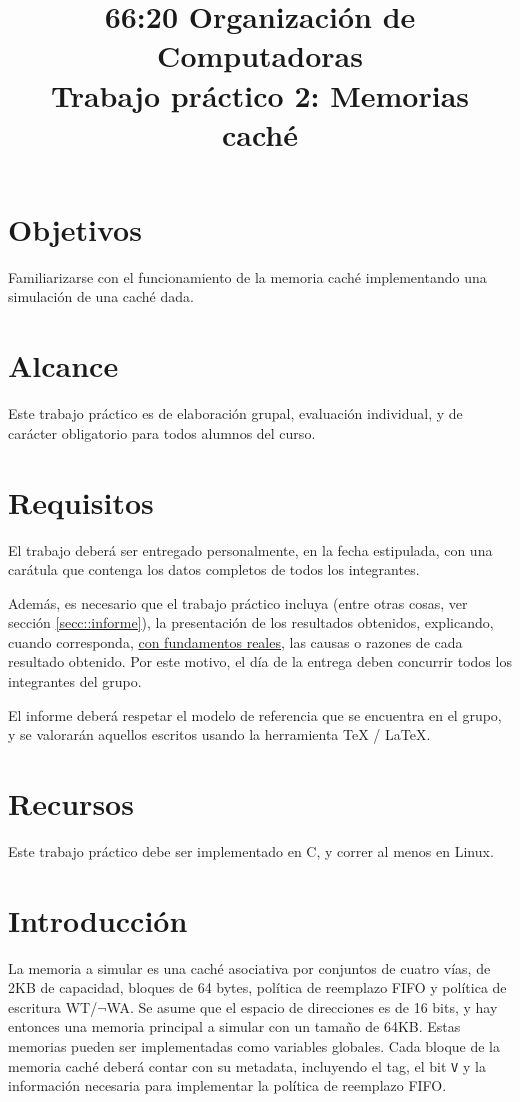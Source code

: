\documentclass[a4paper,11pt]{article}
\title{66:20 Organización de Computadoras\\
       Trabajo práctico 2: Memorias caché}
\author{}
\date{}
\begin{document}
\maketitle
\thispagestyle{empty}   %

\section{Objetivos}
Familiarizarse con el funcionamiento de la memoria caché implementando una simulación de una caché dada.
\section{Alcance}

Este trabajo práctico es de elaboración grupal, evaluación individual, y de
carácter obligatorio para todos alumnos del curso.

\section{Requisitos}
El trabajo deberá ser entregado personalmente, en la fecha estipulada, con una
carátula que contenga los datos completos de todos los integrantes. 

Además, es necesario que el trabajo práctico incluya (entre otras cosas, ver 
sección \ref{secc::informe}), la presentación de los resultados obtenidos, 
explicando, cuando corresponda, \underline{con fundamentos reales}, las causas
o razones de cada resultado obtenido. Por este motivo, el día de la entrega deben 
concurrir todos los integrantes del grupo.

El informe deberá respetar el modelo de referencia que se encuentra en el
grupo, y se valorarán aquellos escritos usando la herramienta \TeX{} / 
\LaTeX{}.

\section{Recursos}
Este trabajo práctico debe ser implementado en C\cite{KeRi}, y correr al menos en Linux.

\section{Introducción}
\label{secc::intro}
La memoria a simular es una caché\cite{HePa} asociativa por conjuntos de cuatro vías, de 2KB de capacidad, bloques de 64 bytes, política de reemplazo FIFO y política de escritura WT/$\neg$WA. Se asume que el espacio de direcciones es de 16 bits, y hay entonces una memoria principal a simular con un tamaño de 64KB. Estas memorias pueden ser implementadas como variables globales. Cada bloque de la memoria caché deberá contar con su metadata, incluyendo el tag, el bit \texttt{V} y la información necesaria para implementar la política de reemplazo FIFO.
\end{document}
